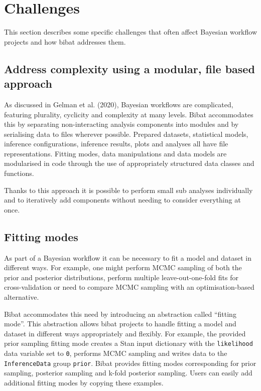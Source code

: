 \documentclass[
  letterpaper,
  DIV=11,
  numbers=noendperiod]{scrartcl}
\begin{document}
\section{Challenges}\label{challenges}

This section describes some specific challenges that often affect
Bayesian workflow projects and how bibat addresses them.

\subsection{Address complexity using a modular, file based
approach}\label{address-complexity-using-a-modular-file-based-approach}

As discussed in Gelman et al. (2020), Bayesian workflows are
complicated, featuring plurality, cyclicity and complexity at many
levels. Bibat accommodates this by separating non-interacting analysis
components into modules and by serialising data to files wherever
possible. Prepared datasets, statistical models, inference
configurations, inference results, plots and analyses all have file
representations. Fitting modes, data manipulations and data models are
modularised in code through the use of appropriately structured data
classes and functions.

Thanks to this approach it is possible to perform small sub analyses
individually and to iteratively add components without needing to
consider everything at once.

\subsection{Fitting modes}\label{fitting-modes}

As part of a Bayesian workflow it can be necessary to fit a model and
dataset in different ways. For example, one might perform MCMC sampling
of both the prior and posterior distributions, perform multiple
leave-out-one-fold fits for cross-validation or need to compare MCMC
sampling with an optimisation-based alternative.

Bibat accommodates this need by introducing an abstraction called
``fitting mode''. This abstraction allows bibat projects to handle
fitting a model and dataset in different ways appropriately and
flexibly. For example, the provided prior sampling fitting mode creates
a Stan input dictionary with the \texttt{likelihood} data variable set
to \texttt{0}, performs MCMC sampling and writes data to the
\texttt{InferenceData} group \texttt{prior}. Bibat provides fitting
modes corresponding for prior sampling, posterior sampling and k-fold
posterior sampling. Users can easily add additional fitting modes by
copying these examples.
\end{document}
